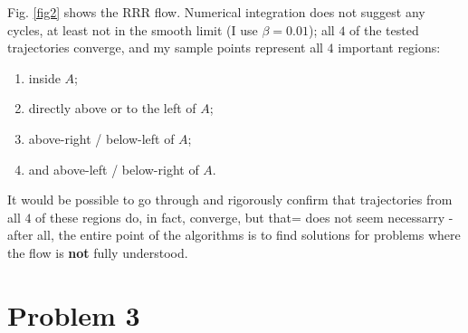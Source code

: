 \documentclass[psamsfonts]{amsart}
\theoremstyle{definition}
\theoremstyle{remark}
\numberwithin{equation}{section}
\begin{document}
Fig. \ref{fig2} shows the RRR flow. 
Numerical integration does not suggest any cycles, at least not in the smooth limit (I use $\beta = 0.01$); 
all $4$ of the tested trajectories converge, and my sample points represent all $4$ important regions:
\begin{enumerate}
\item
inside $A$; 
\item
directly above or to the left of $A$; 
\item
above-right /  below-left of $A$; 
\item
and above-left / below-right of $A$.
\end{enumerate}

It would be possible to go through and rigorously confirm that trajectories from all $4$ of these regions do, in fact, converge, 
but that= does not seem necessarry - after all, the entire point of the algorithms is to find solutions for problems where the 
flow is \textbf{not} fully understood.

\pagebreak
\section{Problem 3}
\end{document}
